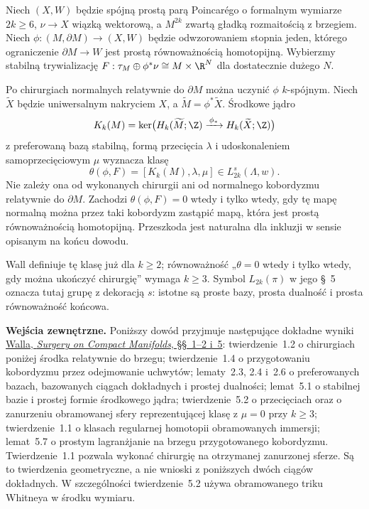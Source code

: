 \begin{twierdzenie}
\label{thm:Wall-parzyste-pelne-22}
Niech $(X,W)$ będzie spójną prostą parą Poincarégo o formalnym
wymiarze $2k\geq6$, $\nu\to X$ wiązką wektorową, a $M^{2k}$
zwartą gładką rozmaitością z brzegiem. Niech
$\phi:(M,\partial M)\to(X,W)$ będzie odwzorowaniem stopnia jeden,
którego ograniczenie $\partial M\to W$ jest prostą równoważnością
homotopijną. Wybierzmy stabilną trywializację
$F:\tau_M\oplus\phi^*\nu\cong M\times\R^N$ dla dostatecznie
dużego $N$.

Po chirurgiach normalnych relatywnie do $\partial M$ można
uczynić $\phi$ $k$-spójnym. Niech $\widetilde X$ będzie
uniwersalnym nakryciem $X$, a $\widetilde M=\phi^*\widetilde X$.
Środkowe jądro
\[
 K_k(M)=\ker\bigl(H_k(\widetilde M;\Z)
                \xrightarrow{\,\phi_*\,}H_k(\widetilde X;\Z)\bigr)
\]
z preferowaną bazą stabilną, formą przecięcia $\lambda$
i udoskonaleniem samoprzecięciowym $\mu$ wyznacza klasę
\[
 \theta(\phi,F)=[K_k(M),\lambda,\mu]
       \in L^s_{2k}(\Lambda,w).
\]
Nie zależy ona od wykonanych chirurgii ani od normalnego
kobordyzmu relatywnie do $\partial M$. Zachodzi
$\theta(\phi,F)=0$ wtedy i tylko wtedy, gdy tę mapę normalną
można przez taki kobordyzm zastąpić mapą, która jest prostą
równoważnością homotopijną. Przeszkoda jest naturalna dla
inkluzji w sensie opisanym na końcu dowodu.
\end{twierdzenie}

Wall definiuje tę klasę już dla $k\geq2$; równoważność
„$\theta=0$ wtedy i tylko wtedy, gdy można ukończyć chirurgię”
wymaga $k\geq3$. Symbol $L_{2k}(\pi)$ w jego §~5 oznacza tutaj
grupę z dekoracją $s$: istotne są proste bazy, prosta dualność
i prosta równoważność końcowa.

\noindent\textbf{Wejścia zewnętrzne.}
Poniższy dowód przyjmuje następujące dokładne wyniki
\href{https://www.maths.ed.ac.uk/~v1ranick/books/scm.pdf}
{Walla, \emph{Surgery on Compact Manifolds}, §§~1--2 i~5}:
twierdzenie~1.2 o chirurgiach poniżej środka relatywnie do
brzegu; twierdzenie~1.4 o przygotowaniu kobordyzmu przez
odejmowanie uchwytów; lematy~2.3, 2.4 i~2.6 o preferowanych
bazach, bazowanych ciągach dokładnych i prostej dualności;
lemat~5.1 o stabilnej bazie i prostej formie środkowego jądra;
twierdzenie~5.2 o przecięciach oraz o zanurzeniu obramowanej
sfery reprezentującej klasę z $\mu=0$ przy $k\geq3$;
twierdzenie~1.1 o klasach regularnej homotopii
obramowanych immersji;
lemat~5.7 o prostym lagranżjanie na brzegu przygotowanego
kobordyzmu. Twierdzenie~1.1 pozwala wykonać chirurgię
na otrzymanej zanurzonej sferze. Są to twierdzenia
geometryczne, a nie wnioski z poniższych dwóch ciągów
dokładnych. W szczególności twierdzenie~5.2 używa
obramowanego triku Whitneya w środku wymiaru.

